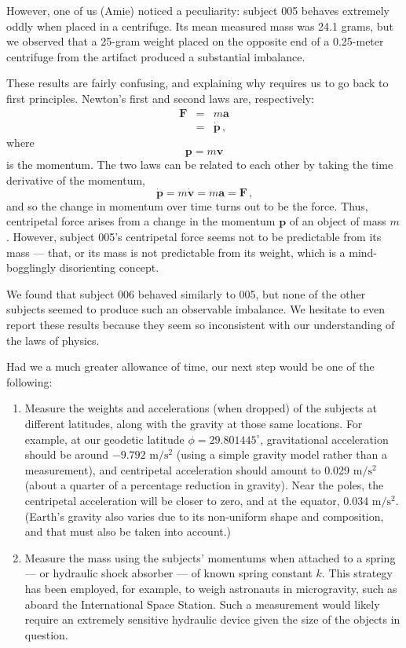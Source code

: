 \documentclass[10pt]{article}
\theoremstyle{definition}
\begin{document}
However, one of us (Amie) noticed a peculiarity: subject 005 behaves extremely oddly when placed in a centrifuge.
Its mean measured mass was 24.1 grams, but we observed that a 25-gram weight placed on the opposite end of a 0.25-meter centrifuge from the artifact produced a substantial imbalance.

These results are fairly confusing, and explaining why requires us to go back to first principles.
Newton's first and second laws are, respectively:
%
\begin{eqnarray}
\mathbf{F} &=& m \mathbf{a} \\
 &=& \dot{\mathbf{p}}\,\textrm{,}
\end{eqnarray}
%
where
%
\begin{equation}
\mathbf{p} = m \mathbf{v}
\end{equation}
%
is the momentum.
%
The two laws can be related to each other by taking the time derivative of the momentum,
%
\begin{equation}
\dot{\mathbf{p}} = m \dot{\mathbf{v}} = m \mathbf{a} = \mathbf{F}\,\textrm{,}
\end{equation}
%
and so the change in momentum over time turns out to be the force.
Thus, centripetal force arises from a change in the momentum $\mathbf{p}$ of an object of mass $m$.
However, subject 005's centripetal force seems not to be predictable from its mass --- that, or its mass is not predictable from its weight, which is a mind-bogglingly disorienting concept.

We found that subject 006 behaved similarly to 005, but none of the other subjects seemed to produce such an observable imbalance.
We hesitate to even report these results because they seem so inconsistent with our understanding of the laws of physics.

Had we a much greater allowance of time, our next step would be one of the following:
\begin{enumerate}
\item Measure the weights and accelerations (when dropped) of the subjects at different latitudes, along with the gravity at those same locations. For example, at our geodetic latitude $\phi=29.801445^\circ$, gravitational acceleration should be around $-9.792\textrm{ m}/\textrm{s}^2$ (using a simple gravity model rather than a measurement), and centripetal acceleration should amount to 0.029 $\textrm{m}/\textrm{s}^2$ (about a quarter of a percentage reduction in gravity). Near the poles, the centripetal acceleration will be closer to zero, and at the equator, 0.034 $\textrm{m}/\textrm{s}^2$. (Earth's gravity also varies due to its non-uniform shape and composition, and that must also be taken into account.)
\item Measure the mass using the subjects' momentums when attached to a spring --- or hydraulic shock absorber --- of known spring constant $k$. This strategy has been employed, for example, to weigh astronauts in microgravity, such as aboard the International Space Station. Such a measurement would likely require an extremely sensitive hydraulic device given the size of the objects in question.
\end{enumerate}
\end{document}
